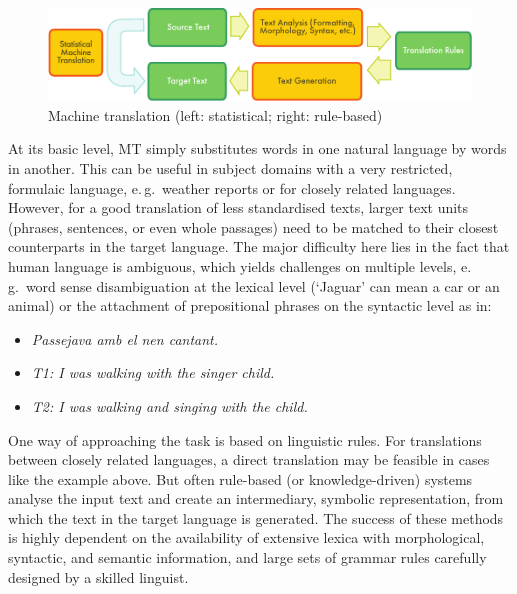 \begin{multicols}{2}

\begin{figure}[htb]
  \center
  \includegraphics[width=\textwidth]{../_media/english/machine_translation}
  \caption{Machine translation (left: statistical; right: rule-based)}
  \label{fig:mtarch_en}
\end{figure}

At its basic level, MT simply substitutes words in one natural language by words in another. This can be useful in subject domains with a very restricted, formulaic language, e.\,g.~weather reports or for closely related languages. However, for a good translation of less standardised texts, larger text units (phrases, sentences, or even whole passages) need to be matched to their closest counterparts in the target language. The major difficulty here lies in the fact that human language is ambiguous, which yields challenges on multiple levels, e.\,g.~word sense disambiguation at the lexical level (‘Jaguar’ can mean a car or an animal) or the attachment of prepositional phrases on the syntactic level as in:
\begin{itemize}
\item \textit{Passejava amb el nen cantant.}
\item \textit{T1: I was walking with the singer child.}
\item \textit{T2: I was walking and singing with the child.}
\end{itemize}

One way of approaching the task is based on linguistic rules. For translations between closely related languages, a direct translation may be feasible in cases like the example above. But often rule-based (or knowledge-driven) systems analyse the input text and create an intermediary, symbolic representation, from which the text in the target language is generated. The success of these methods is highly dependent on the availability of extensive lexica with morphological, syntactic, and semantic information, and large sets of grammar rules carefully designed by a skilled linguist.


\end{multicols}
